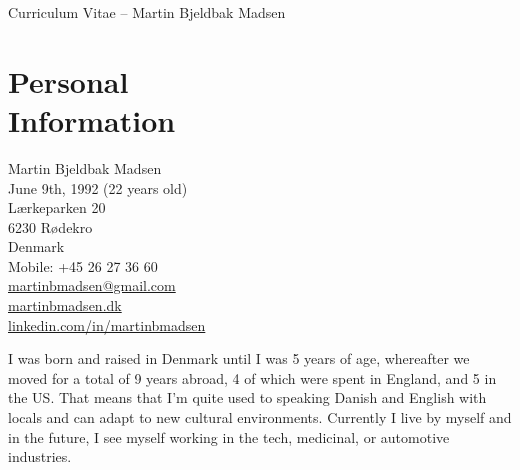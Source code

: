 \documentclass[margin,line,a4paper]{resume}
\begin{document}
\raggedright
{\sc \Large Curriculum Vitae -- Martin Bjeldbak Madsen}
\begin{resume}
    \vspace{0.5cm}
    \begin{figure}
         \vspace{-1cm}
        \begin{center}
        \end{center}
         \vspace{-2cm}
    \end{figure}

    \section{\mysidestyle Personal\\Information}%
    Martin Bjeldbak Madsen\\
    June 9th, 1992 (22 years old)\\ 
    Lærkeparken 20\\
    6230 Rødekro\\
    Denmark\\
    Mobile: +45 26 27 36 60\\
    \href{mailto:martinbmadsen@gmail.com}{martinbmadsen@gmail.com}\\
    \href{http://martinbmadsen.dk}{martinbmadsen.dk}\\
    \href{http://dk.linkedin.com/in/martinbmadsen/}{linkedin.com/in/martinbmadsen}
    \vspace{1cm}

    I was born and raised in Denmark until I was 5 years of age,
    whereafter we moved for a total of 9 years abroad, 4 of which
    were spent in England, and 5 in the US. That means that I'm quite
    used to speaking Danish and English with locals and can adapt to
    new cultural environments. Currently I live by myself and in the
    future, I see myself working in the tech, medicinal, or automotive
    industries.


\end{resume}
\end{document}
